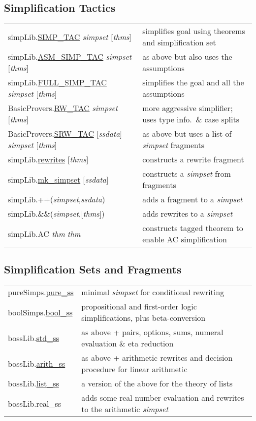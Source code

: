 \documentclass[landscape,10pt]{article}
\newcommand{\hol}[2]{{\sffamily #1.\href{#1.#2.html}{#2}}}
\newcommand{\holnoref}[2]{{\sffamily #1.#2}}
\newcommand{\var}[1]{{\emph{#1}}}
\begin{document}
\begin{multicols}{2}
\subsection*{Simplification Tactics}
\begin{tabular}{ll}
\hol{simpLib}{SIMP_TAC} \var{simpset} [\var{thms}] & simplifies goal using theorems and simplification set \\
\hol{simpLib}{ASM_SIMP_TAC} \var{simpset} [\var{thms}] & as above but also uses the assumptions \\
\hol{simpLib}{FULL_SIMP_TAC} \var{simpset} [\var{thms}] & simplifies the goal and all the assumptions \\[4pt]
\hol{BasicProvers}{RW_TAC} \var{simpset} [\var{thms}] & more aggressive simplifier; uses type info.\ \& case splits \\
\hol{BasicProvers}{SRW_TAC} [\var{ssdata}] \var{simpset} [\var{thms}] & as above but uses a list of \emph{simpset} fragments \\[4pt]
\hol{simpLib}{rewrites} [\var{thms}] & constructs a rewrite fragment \\
\hol{simpLib}{mk_simpset} [\var{ssdata}] & constructs a \emph{simpset} from fragments \\
\holnoref{simpLib}{++}(\var{simpset},\var{ssdata}) & adds a fragment to a \emph{simpset} \\ %
\holnoref{simpLib}{\&\&}(\var{simpset},[\var{thms}]) & adds rewrites to a \emph{simpset} \\ %
\holnoref{simpLib}{AC} \var{thm} \var{thm} & constructs tagged theorem to enable AC simplification \\
\end{tabular}
\subsection*{Simplification Sets and Fragments}
\begin{tabular}{ll}
\hol{pureSimps}{pure_ss} & minimal \emph{simpset} for conditional rewriting \\
\hol{boolSimps}{bool_ss} & propositional and first-order logic simplifications, plus beta-conversion \\
\hol{bossLib}{std_ss} & as above + pairs, options, sums, numeral evaluation \& eta reduction \\
\hol{bossLib}{arith_ss} & as above + arithmetic rewrites and decision procedure for linear arithmetic \\
\hol{bossLib}{list_ss} & a version of the above for the theory of lists \\
\holnoref{bossLib}{real_ss} & adds some real number evaluation and rewrites to the arithmetic \emph{simpset} \\
\end{tabular}


\end{multicols}
\end{document}
